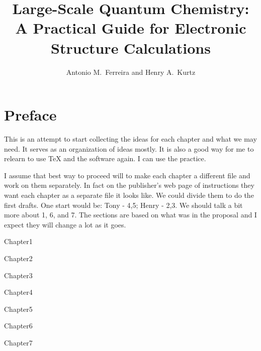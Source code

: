 \documentclass[oneside,12pt]{book}
\begin{document}
\graphicspath{{Graphics/}}

\frontmatter
\title{Large-Scale Quantum Chemistry: A Practical Guide for Electronic Structure Calculations}
\author{Antonio M.\ Ferreira and Henry A.\ Kurtz}

\maketitle

\tableofcontents

\chapter*{Preface}


This is an attempt to start collecting the ideas for each chapter and what we may need.  It serves as an organization of ideas mostly.  It is also a good way for me to relearn to use TeX and the software again.  I can use the practice.

I assume that best way to proceed will to make each chapter a different file and work on them separately.  In fact on the publisher's web page of instructions they want each chapter as a separate file it looks like.  We could divide them to do the first drafts.  One start would be: Tony - 4,5; Henry - 2,3.  We should talk a bit more about 1, 6, and 7.  The sections are based on what was in the proposal and I expect they will change a lot as it goes.

\mainmatter
 {Chapter1}

 {Chapter2}

 {Chapter3}

 {Chapter4}

 {Chapter5}

 {Chapter6}

 {Chapter7}





% 
%

\printindex
\end{document}
